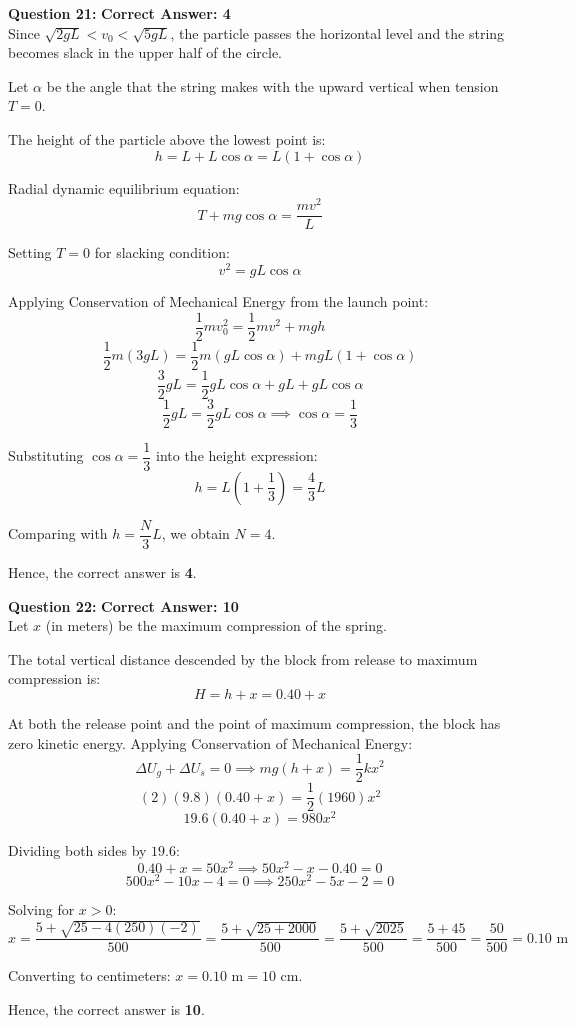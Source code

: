 \documentclass[11pt,a4paper]{article}
\begin{document}
\begin{tcolorbox}[solbox]
\textbf{\textcolor{primaryDark}{Question 21:}} \hfill \textbf{\textcolor{l1Green}{Correct Answer: 4}}\\
\vspace{4pt}
Since $\sqrt{2gL} < v_0 < \sqrt{5gL}$, the particle passes the horizontal level and the string becomes slack in the upper half of the circle.

Let $\alpha$ be the angle that the string makes with the upward vertical when tension $T = 0$.

The height of the particle above the lowest point is:
$$h = L + L\cos\alpha = L(1 + \cos\alpha)$$

Radial dynamic equilibrium equation:
$$T + mg\cos\alpha = \frac{m v^2}{L}$$

Setting $T = 0$ for slacking condition:
$$v^2 = gL\cos\alpha$$

Applying Conservation of Mechanical Energy from the launch point:
$$\frac{1}{2}m v_0^2 = \frac{1}{2}m v^2 + mgh$$
$$\frac{1}{2}m(3gL) = \frac{1}{2}m(gL\cos\alpha) + mgL(1 + \cos\alpha)$$
$$\frac{3}{2}gL = \frac{1}{2}gL\cos\alpha + gL + gL\cos\alpha$$
$$\frac{1}{2}gL = \frac{3}{2}gL\cos\alpha \implies \cos\alpha = \frac{1}{3}$$

Substituting $\cos\alpha = \dfrac{1}{3}$ into the height expression:
$$h = L\left(1 + \frac{1}{3}\right) = \frac{4}{3}L$$

Comparing with $h = \dfrac{N}{3}L$, we obtain $N = 4$.

Hence, the correct answer is \textbf{4}.
\end{tcolorbox}

\begin{tcolorbox}[solbox]
\textbf{\textcolor{primaryDark}{Question 22:}} \hfill \textbf{\textcolor{l1Green}{Correct Answer: 10}}\\
\vspace{4pt}
Let $x$ (in meters) be the maximum compression of the spring.

The total vertical distance descended by the block from release to maximum compression is:
$$H = h + x = 0.40 + x$$

At both the release point and the point of maximum compression, the block has zero kinetic energy.
Applying Conservation of Mechanical Energy:
$$\Delta U_g + \Delta U_s = 0 \implies mg(h + x) = \frac{1}{2}kx^2$$
$$(2)(9.8)(0.40 + x) = \frac{1}{2}(1960)x^2$$
$$19.6(0.40 + x) = 980 x^2$$

Dividing both sides by $19.6$:
$$0.40 + x = 50 x^2 \implies 50 x^2 - x - 0.40 = 0$$
$$500 x^2 - 10 x - 4 = 0 \implies 250 x^2 - 5 x - 2 = 0$$

Solving for $x > 0$:
$$x = \frac{5 + \sqrt{25 - 4(250)(-2)}}{500} = \frac{5 + \sqrt{25 + 2000}}{500} = \frac{5 + \sqrt{2025}}{500} = \frac{5 + 45}{500} = \frac{50}{500} = 0.10\text{ m}$$

Converting to centimeters: $x = 0.10\text{ m} = 10\text{ cm}$.

Hence, the correct answer is \textbf{10}.
\end{tcolorbox}
\end{document}
